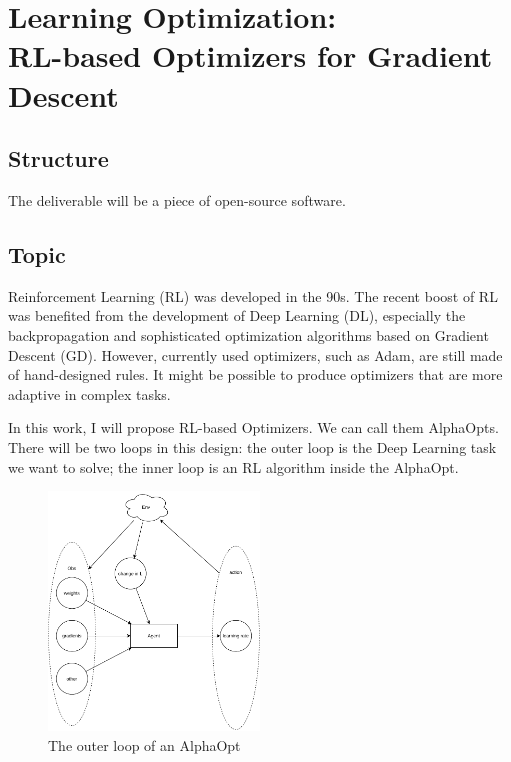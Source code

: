 



\section{Learning Optimization:\\ RL-based Optimizers for Gradient Descent}

\subsection{Structure}
The deliverable will be a piece of open-source software.

\subsection{Topic}
Reinforcement Learning (RL) was developed in the 90s.
The recent boost of RL was benefited from the development of Deep Learning (DL), especially the backpropagation and sophisticated optimization algorithms based on Gradient Descent (GD).
However, currently used optimizers, such as Adam, are still made of hand-designed rules.
It might be possible to produce optimizers that are more adaptive in complex tasks.

In this work, I will propose RL-based Optimizers. We can call them AlphaOpts.
There will be two loops in this design: the outer loop is the Deep Learning task we want to solve; the inner loop is an RL algorithm inside the AlphaOpt.

\begin{figure}[h]
    \center
    \includegraphics[width=0.5\textwidth]{images/AlphaOpt.pdf}
    \caption{The outer loop of an AlphaOpt}
\end{figure}

